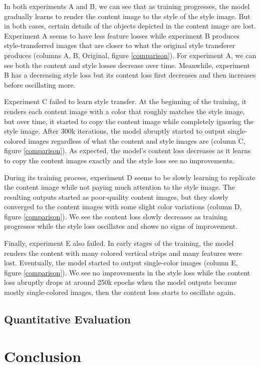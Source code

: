 \documentclass{article}
\begin{document}
In both experiments A and B, we can see that as training progresses, the model gradually learns to render the content image to the style of the style image. But in both cases, certain details of the objects depicted in the content image are lost. Experiment A seems to have less feature losses while experiment B produces style-transferred images that are closer to what the original style transferer produces (columns A, B, Original, figure \ref{comparison}). For experiment A, we can see both the content and style losses decrease over time. Meanwhile, experiment B has a decreasing style loss but its content loss first decreases and then increases before oscillating more.

Experiment C failed to learn style transfer. At the beginning of the training, it renders each content image with a color that roughly matches the style image, but over time, it started to copy the content image while completely ignoring the style image. After 300k iterations, the model abruptly started to output single-colored images regardless of what the content and style images are (column C, figure \ref{comparison}). As expected, the model's content loss decreases as it learns to copy the content images exactly and the style loss see no improvements.

During its training process, experiment D seems to be slowly learning to replicate the content image while not paying much attention to the style image. The resulting outputs started as poor-quality content images, but they slowly converged to the content images with some slight color variations (column D, figure \ref{comparison}). We see the content loss slowly decreases as training progresses while the style loss oscillates and shows no signs of improvement.

Finally, experiment E also failed. In early stages of the training, the model renders the content with many colored vertical strips and many features were lost. Eventually, the model started to output single-color images (column E, figure \ref{comparison}). We see no improvements in the style loss while the content loss abruptly drops at around 250k epochs when the model outputs became mostly single-colored images, then the content loss starts to oscillate again.

\subsection{Quantitative Evaluation}

\section{Conclusion}

\medskip

\nocite{*}


\end{document}
